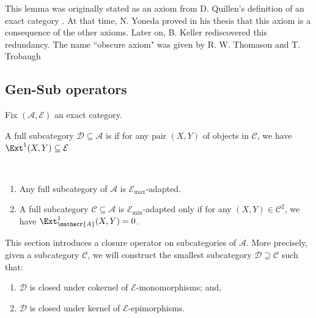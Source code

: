 \begin{remark} \label{rem:obscure}
    This lemma was originally stated as an axiom from D. Quillen's definition of an exact category \cite{Q73}. At that time, N. Yoneda proved in his thesis \cite{Y61} that this axiom is a consequence of the other axioms. Later on, B. Keller \cite{K90} rediscovered this redundancy. The name ``obscure axiom" was given by R. W. Thomason and T. Trobaugh \cite{TT07}
\end{remark}

\subsection{Gen-Sub operators}
\label{ss:GenSuboperators}

Fix $(\mathscr{A},\mathcal{E})$ an exact category. 

\begin{definition} \label{def:Eadpted}
    A full subcategory $\mathscr{D} \subseteq \mathscr{A}$ is  if for any pair $(X,Y)$ of objects in $\mathscr{C}$, we have $\Ext^1(X,Y) \subseteq \mathcal{E}$
\end{definition}
\begin{ex} $ $
\begin{enumerate}[label=$\bullet$, itemsep=1mm]
    \item Any full subcategory of $\mathscr{A}$ is $\mathcal{E}_{\max}$-adapted.
    \item A full subcategory $\mathscr{C} \subseteq \mathscr{A}$ is $\mathcal{E}_{\min}$-adapted only if for any $(X,Y) \in \mathscr{C}^2$, we have $\Ext_\mathscr{A}^1 (X,Y) = 0$.
\end{enumerate}

\end{ex}
This section introduces a closure operator on subcategories of $\mathscr{A}$. More precisely, given a subcategory $\mathscr{C}$, we will construct the smallest subcategory $\mathscr{D} \supseteq \mathscr{C}$ such that:
\begin{enumerate}[label=$\bullet$,itemsep=1mm]
    \item $\mathscr{D}$ is closed under cokernel of $\mathcal{E}$-monomorphisms; and,
    \item  $\mathscr{D}$ is closed under kernel of $\mathcal{E}$-epimorphisms.
\end{enumerate}

